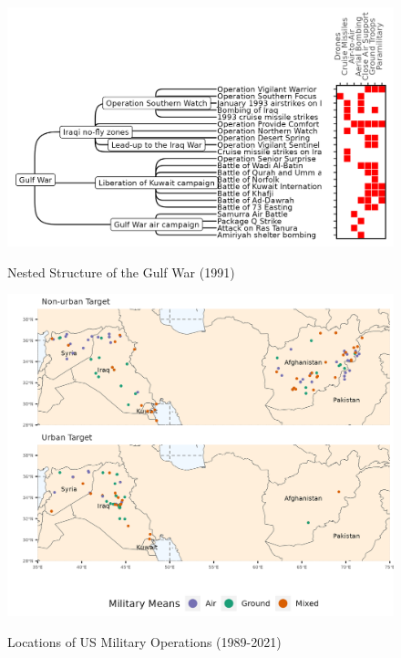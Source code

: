 \documentclass[fleqn,12pt]{article}
\begin{document}
\clearpage
{}
\newpage
\begin{figure}[h]
	\begin{center}
		\caption{Nested Structure of the Gulf War (1991)}
		{\includegraphics[width = \textwidth]{fig-nested-1.png}}
		\label{fig:fig-nested-1}
		\vspace{0.1 in}
	\end{center}
\end{figure}

\clearpage
{}
\newpage
\begin{figure}[h]
	\begin{center}
		\caption{Locations of US Military Operations (1989-2021)}
		{\includegraphics[width = \textwidth]{fig-map-1.png}}
		\label{fig:fig-map-1}
		\vspace{0.1 in}
	\end{center}
\end{figure}
\end{document}
